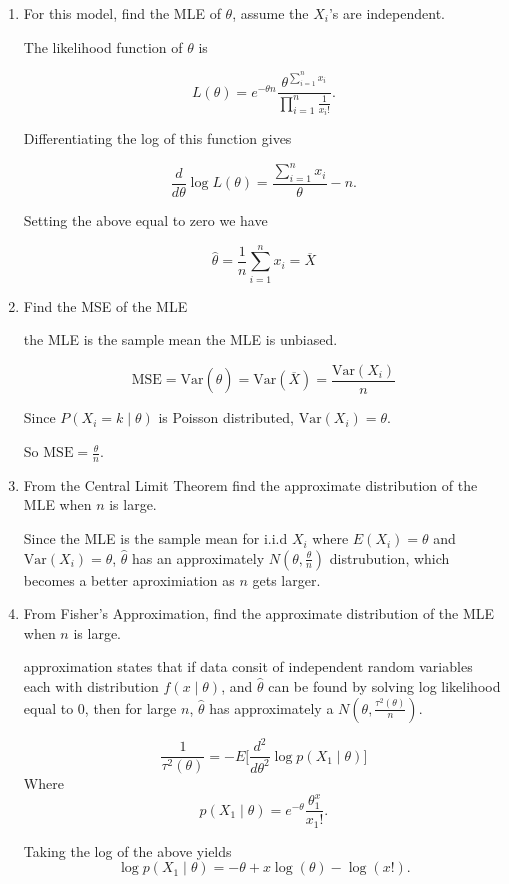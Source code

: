 \documentclass{tufte-book}
\newcommand{\Var}{\mathrm{Var}}
\newcommand{\MSE}{\mathrm{MSE}}
\theoremstyle{mytheoremstyle}
\theoremstyle{mylemstyle}
\theoremstyle{mydefstyle}
\begin{document}
\begin{enumerate}

\item For this model, find the MLE of $\theta$, assume the $X_i$'s are independent.

The likelihood function of $\theta$ is

\[ L(\theta) = e^{-\theta n}  \frac{\theta^{\sum_{i=1}^n x_i}}{ \prod_{i=1}^n \frac{1}{x_i!}}. \]

Differentiating the log of this function gives

\[ \frac{d}{d\theta}\log L(\theta) = \frac{\sum_{i=1}^n x_i}{\theta} - n. \]

Setting the above equal to zero we have

\[ \hat{\theta} = \frac{1}{n} \sum_{i=1}^n x_i = \overline{X} \]

\item Find the MSE of the MLE

 the MLE is the sample mean the MLE is unbiased.

\[\MSE = \Var(\hat{\theta}) = \Var(\overline{X}) =  \frac{\Var(X_i)}{n} \]

Since $P(X_i=k\mid \theta)$ is Poisson distributed, $\Var(X_i)=\theta$.

So $\MSE = \frac{\theta}{n}$.

\item From the Central Limit Theorem find the approximate distribution of the MLE when $n$ is large.

Since the MLE is the sample mean for i.i.d $X_i$ where $E(X_i)=\theta$ and $\Var(X_i)=\theta$, $\hat{\theta}$ has an approximately $N(\theta,\frac{\theta}{n})$ distrubution, which becomes a better aproximiation as $n$ gets larger.

\item From Fisher's Approximation, find the approximate distribution of the MLE when $n$ is large.

 approximation states that if data consit of independent random variables each with distribution $f(x\mid\theta)$, and $\hat{\theta}$ can be found by solving log likelihood equal to 0, then for large $n$, $\hat{\theta}$ has approximately a $N(\theta, \frac{\tau^2(\theta)}{n})$.

\[ \frac{1}{\tau^2(\theta)} = -E\Big[ \frac{d^2}{d\theta^2}\log p(X_1\mid \theta)\Big] \]
Where
\[ p(X_1 \mid \theta) = e^{-\theta} \frac{\theta^x_1}{x_1!}. \]

Taking the log of the above yields
\[\log p(X_1 \mid \theta) = -\theta + x \log(\theta) - \log(x!). \]


\end{enumerate}
\end{document}
